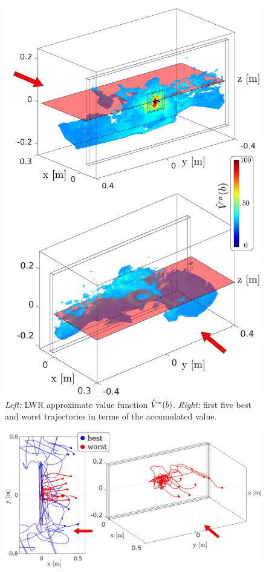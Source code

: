 \begin{figure}
 \centering
 \setlength\fboxsep{0pt}
  \setlength\fboxrule{0.25pt}
  \includegraphics[width=\textwidth]{./ch4-PiH/Figures/ValueFunction/value_func_final_v2.pdf}
 \caption{\textit{Left:} LWR approximate value function $\hat{V}^{\pi}(b)$. \textit{Right:} first five best and worst trajectories in terms of the accumulated value.}
  \label{fig:Figure1}
\end{figure}

\begin{figure}
 \centering
 \includegraphics[width=\textwidth]{./ch4-PiH/Figures/ValueFunction/value_func_final_v3.pdf}
 \caption{} 
\end{figure}


